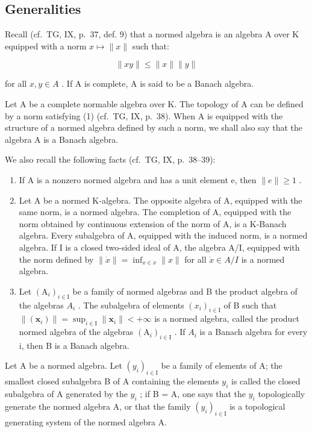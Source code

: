 \subsection{Generalities}

Recall (cf.~TG, IX, p.~37, def. 9) that a normed algebra is an algebra A over K equipped with a norm \(x \mapsto \|x\|\) such that:

\[
\| x y \| \leqslant \| x \| \| y \|\tag{1}
\]

for all \(x, y \in A\) . If A is complete, A is said to be a Banach algebra.

Let A be a complete normable algebra over K. The topology of A can be defined by a norm satisfying (1) (cf.~TG, IX, p.~38). When A is equipped with the structure of a normed algebra defined by such a norm, we shall also say that the algebra A is a Banach algebra.

We also recall the following facts (cf.~TG, IX, p.~38--39):

\begin{enumerate}
\def\labelenumi{(\arabic{enumi})}
\item
  If A is a nonzero normed algebra and has a unit element e, then \(\|e\|\geqslant1\) .
\item
  Let A be a normed K-algebra. The opposite algebra of A, equipped with the same norm, is a normed algebra. The completion of A, equipped with the norm obtained by continuous extension of the norm of A, is a K-Banach algebra. Every subalgebra of A, equipped with the induced norm, is a normed algebra. If I is a closed two-sided ideal of A, the algebra A/I, equipped with the norm defined by \(\|\dot{x}\| = \inf_{x \in \dot{x}} \|x\|\) for all \(\dot{x} \in A/I\) is a normed algebra.
\item
  Let \((\mathrm{A}_{i})_{i\in\mathrm{I}}\) be a family of normed algebras and B the product algebra of the algebras \(A_{i}\) . The subalgebra of elements \((x_{i})_{i\in\mathrm{I}}\) of B such that \(\|(\boldsymbol{x}_{i})\|=\sup_{i\in\mathrm{I}}\|\boldsymbol{x}_{i}\|<+\infty\) is a normed algebra, called the product normed algebra of the algebras \((\mathrm{A}_{i})_{i\in\mathrm{I}}\) . If \(A_{i}\) is a Banach algebra for every i, then B is a Banach algebra.
\end{enumerate}

Let A be a normed algebra. Let \((y_{i})_{i\in\mathrm{I}}\) be a family of elements of A; the smallest closed subalgebra B of A containing the elements \(y_{i}\) is called the closed subalgebra of A generated by the \(y_{i}\) ; if B = A, one says that the \(y_{i}\) topologically generate the normed algebra A, or that the family \((y_{i})_{i\in\mathrm{I}}\) is a topological generating system of the normed algebra A.

